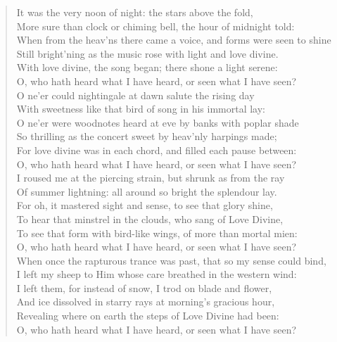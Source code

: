 
\begin{verse}
It was the very noon of night: the stars above the fold,\\
More sure than clock or chiming bell, the hour of midnight told:\\
When from the heav'ns there came a voice, and forms were seen to shine\\
Still bright'ning as the music rose with light and love divine.\\
With love divine, the song began; there shone a light serene:\\
O, who hath heard what I have heard, or seen what I have seen?\\[0.7em]

O ne'er could nightingale at dawn salute the rising day\\
With sweetness like that bird of song in his immortal lay:\\
O ne'er were woodnotes heard at eve by banks with poplar shade\\
So thrilling as the concert sweet by heav'nly harpings made;\\
For love divine was in each chord, and filled each pause between:\\
O, who hath heard what I have heard, or seen what I have seen?\\[0.7em]

I roused me at the piercing strain, but shrunk as from the ray\\
Of summer lightning: all around so bright the splendour lay.\\
For oh, it mastered sight and sense, to see that glory shine,\\
To hear that minstrel in the clouds, who sang of Love Divine,\\
To see that form with bird-like wings, of more than mortal mien:\\
O, who hath heard what I have heard, or seen what I have seen?\\[0.7em]

When once the rapturous trance was past, that so my sense could bind,\\
I left my sheep to Him whose care breathed in the western wind:\\
I left them, for instead of snow, I trod on blade and flower,\\
And ice dissolved in starry rays at morning's gracious hour,\\
Revealing where on earth the steps of Love Divine had been:\\
O, who hath heard what I have heard, or seen what I have seen?\\[0.7em]


\end{verse}
